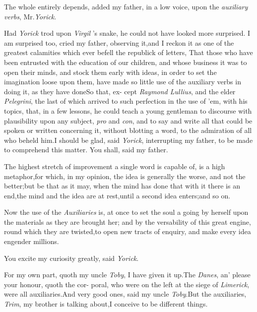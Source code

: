 \documentclass{article}
\begin{document}
\tsh The whole entirely depends, add\-ed my father, in a
low voice, upon the \textit{auxiliary verbs}, Mr.\@ \textit{Yorick}.

Had \textit{Yorick} trod upon \textit{Virgil} ’s snake,
he could not have looked more surprised.\break
\tsk I am surprised too,
cried my father,\break
observing it,\tsk and I reckon it as one of the
greatest calamities which ever befell the republick of letters, That
those who have been entrusted with the education of our children,
and whose business it was to open their minds, and stock them early
with ideas, in order to set the ima\-gination loose upon them, have
made so little use of the auxiliary verbs in doing it, as they have
done\tsh So that, ex- cept \textit{Raymond Lullius}, and the
elder \textit{Pe\-legrini}, the last of which arrived to such
perfection in the use of ’em, with his to\-pics, that, in a few
lessons, he could teach a young gentleman to discourse with
plausibility upon any subject, \textit{pro} and \textit{con}, and to
say and write all that could be spoken or written concerning it,
without blotting a word, to the admiration of all who beheld
him.\tsk I should be glad, said \textit{Yorick}, interrupting my father,
to be made to comprehend this matter. You shall, said my
father.

The highest stretch of improvement a single word is capable of,
is a high metaphor,\tsh for which, in my opinion, the idea
is generally the worse, and not the better;\tsh but be
that as it may, 
\tsk when the mind has done that with it\break
\tsk there is an end,\tsk the mind and the\break
idea are at rest,\tsk until a second idea enters;\tsk and so on.

Now the use of the \textit{Auxiliaries} is, at once to set the
soul a going by herself upon the materials as they are brought her;
and by the versability of this great engine, round which they are
twisted,\break to open new tracts of enquiry, and make every idea
engender millions.

You excite my curiosity greatly, said \textit{Yorick}.

For my own part, quoth my uncle\break
\textit{Toby}, I have given it up.\tsh The \textit{Danes},\break
an’ please your honour, quoth the cor-
poral, who were on the left at the siege of \textit{Limerick}, were all
auxiliaries.\tsh And very good ones, said my uncle
\textit{Toby}.\tsk But the auxiliaries, \textit{Trim}, my brother is
talking about,\tsk I conceive to be different
things.\tsh
\end{document}
